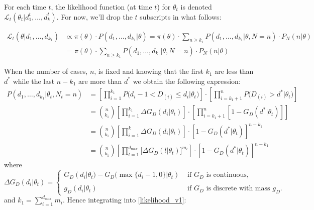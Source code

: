 \documentclass{article}
\begin{document}
For each time $t$, the likelihood function (at time $t$) for $\theta_t$ is denoted $
\mathcal{L}_t(\theta_t  | d_1^t, \dots, d_{k}^t)$.
For now, we'll drop the $t$ subscripts in what follows:

\begin{equation}\label{likelihood_v1}
    \begin{aligned}
    \mathcal{L}_t(\theta  | d_1, \dots, d_{k_1})  
    &\propto \pi(\theta)\cdot P(d_1, \dots, d_{k_1} | \theta) = \pi(\theta)\cdot \sum\limits_{n \geq k_1} P(d_1, \dots, d_{k_1} |\theta, N = n) \cdot P_N(n | \theta) \\
    & = \pi(\theta)\cdot \sum\limits_{n \geq k_1} P(d_1, \dots, d_{k_1} |\theta, N = n) \cdot P_N(n | \theta)   
    \end{aligned}
\end{equation}



When the number of cases, $n$, is fixed and knowing that the first $k_1$ are less than $d^*$ while the last $n - k_1$ are more than $d^*$ we obtain the following expression:
\begin{equation}\label{gooddelay}
    \begin{aligned}
    P(d_1, \dots, d_{k_1} |\theta_t, N_t = n)  &= \left[ \prod\limits_{i=1}^{k_1} P\big(d_i - 1 < D_{(i)} \leq d_i|\theta_t\big)\right] \cdot \left[ \prod\limits_{i=k_1+1}^n P\big(D_{(i)} > d^{*}|\theta_t\big)\right] \\
    & = \binom{n}{k_1}\left[ \prod\limits_{i=1}^{k_1} \Delta G_D(d_i|\theta_t) \right] \cdot \left[ \prod\limits_{i=k_1+1}^n \left[1 - G_D(d^*|\theta_t)\right]\right] 
    \\ & = \binom{n}{k_1}\left[ \prod\limits_{i=1}^k \Delta G_D(d_i|\theta_t) \right] \cdot  \left[1 - G_D(d^*|\theta_t)\right]^{n-k_1}
    \\ & = \binom{n}{k_1}\left[ \prod\limits_{l=1}^{d_{\max}} \big[\Delta G_D(l|\theta_t)\big]^{m_l} \right] \cdot  \left[1 - G_D(d^*|\theta_t)\right]^{n-k_1}
    \end{aligned}
\end{equation}
where
\begin{equation}
    \Delta G_D(d_i|\theta_t) = \begin{cases}
        G_D(d_i|\theta_t) - G_D\big(\max \{d_i - 1, 0\}|\theta_t) & \text{ if } G_{D} \text{ is continuous},\\\\
        g_D(d_i|\theta_t)  & \text{ if } G_{D} \text{ is discrete with mass } g_{D}.
    \end{cases}
\end{equation}
and $k_1 = \sum_{i=1}^{d_{\max}} m_i$.
Hence integrating into \eqref{likelihood_v1}:
\end{document}
